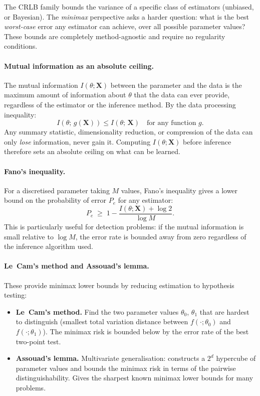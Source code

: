 \documentclass[11pt, a4paper]{article}
\begin{document}
The CRLB family bounds the variance of a specific class of estimators (unbiased,
or Bayesian).
The \emph{minimax} perspective asks a harder question: what is the best
\emph{worst-case} error any estimator can achieve, over all possible parameter values?
These bounds are completely method-agnostic and require no regularity conditions.

\paragraph{Mutual information as an absolute ceiling.}
The mutual information $I(\theta; \mathbf{X})$ between the parameter and the data
is the maximum amount of information about $\theta$ that the data can ever provide,
regardless of the estimator or the inference method.
By the data processing inequality:
\begin{equation}
    I(\theta;\, g(\mathbf{X})) \leq I(\theta;\, \mathbf{X})
    \quad \text{for any function } g.
\end{equation}
Any summary statistic, dimensionality reduction, or compression of the data can
only \emph{lose} information, never gain it.
Computing $I(\theta;\mathbf{X})$ before inference therefore sets an absolute
ceiling on what can be learned.

\paragraph{Fano's inequality.}
For a discretised parameter taking $M$ values, Fano's inequality gives a lower
bound on the probability of error $P_e$ for any estimator:
\begin{equation}
    P_e \;\geq\; 1 - \frac{I(\theta;\mathbf{X}) + \log 2}{\log M}.
\end{equation}
This is particularly useful for detection problems: if the mutual information is
small relative to $\log M$, the error rate is bounded away from zero regardless
of the inference algorithm used.

\paragraph{Le~Cam's method and Assouad's lemma.}
These provide minimax lower bounds by reducing estimation to hypothesis testing:

\begin{itemize}[noitemsep]
    \item \textbf{Le~Cam's method.}
    Find the two parameter values $\theta_0$, $\theta_1$ that are hardest to
    distinguish (smallest total variation distance between $f(\cdot;\theta_0)$
    and $f(\cdot;\theta_1)$).
    The minimax risk is bounded below by the error rate of the best two-point test.
    \item \textbf{Assouad's lemma.}
    Multivariate generalisation: constructs a $2^d$ hypercube of parameter values
    and bounds the minimax risk in terms of the pairwise distinguishability.
    Gives the sharpest known minimax lower bounds for many problems.
\end{itemize}
\end{document}
